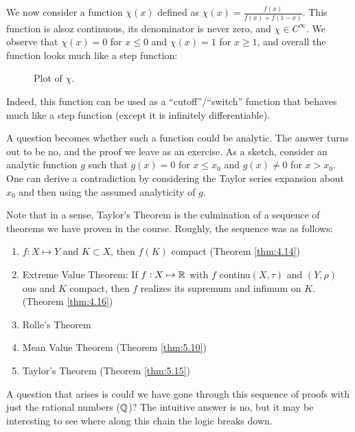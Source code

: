 We now consider a function $\chi(x)$ defined as $\chi(x) = \frac{f(x)}{f(x) + f(1 - x)}$. This function is alsoz continuous, its denominator is never zero, and $\chi \in C^\infty$. We observe that $\chi(x) = 0$ for $x \leq 0$ and $\chi(x) = 1$ for $x \geq 1$, and overall the function looks much like a step function:

\begin{figure}[htbp]
    \centering
    \caption{Plot of $\chi$.}
    \label{fig24}
\end{figure}
Indeed, this function can be used as a ``cutoff''/``switch'' function that behaves much like a step function (except it is infinitely differentiable).

A question becomes whether such a function could be analytic. The answer turns out to be no, and the proof we leave as an exercise. As a sketch, consider an analytic function $g$ such that $g(x) = 0$ for $x \leq x_0$ and $g(x) \neq 0$ for $x > x_0$. One can derive a contradiction by considering the Taylor series expansion about $x_0$ and then using the assumed analyticity of $g$. 

Note that in a sense, Taylor's Theorem is the culmination of a sequence of theorems we have proven in the course. Roughly, the sequence was as follows:
\begin{enumerate}[1)]
    \item $f: X \mapsto Y$ and $K \subset X$, then $f(K)$ compact (Theorem \ref{thm:4.14})
    \item Extreme Value Theorem: If $f: X \mapsto \mathbb{R}$ with $f$ continu$(X, \tau)$ and $(Y, \rho)$ ous and $K$ compact, then $f$ realizes its supremum and infimum on $K$. (Theorem \ref{thm:4.16})
        
    \item Rolle's Theorem
    \item Mean Value Theorem (Theorem \ref{thm:5.10})
    \item Taylor's Theorem (Theorem \ref{thm:5.15})
\end{enumerate}
A question that arises is could we have gone through this sequence of proofs with just the rational numbers ($\mathbb{Q}$)? The intuitive answer is no, but it may be interesting to see where along this chain the logic breaks down.


